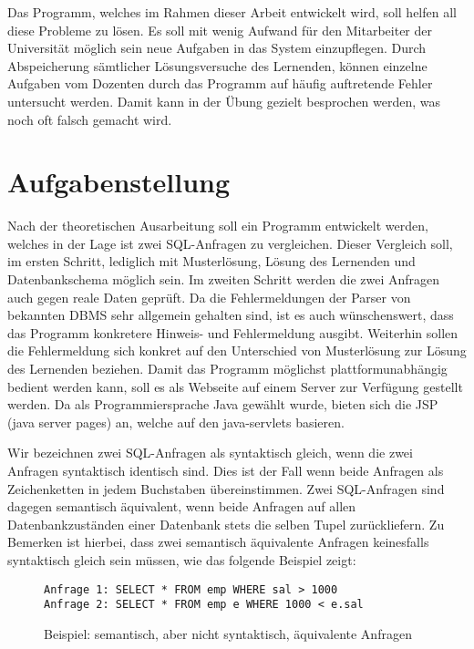 Das Programm, welches im Rahmen dieser Arbeit entwickelt wird, soll helfen all diese Probleme zu lösen. Es soll mit wenig Aufwand für den Mitarbeiter der Universität möglich sein neue Aufgaben in das System einzupflegen. Durch Abspeicherung sämtlicher Lösungsversuche des Lernenden, können einzelne Aufgaben vom Dozenten durch das Programm auf häufig auftretende Fehler untersucht werden. Damit kann in der Übung gezielt besprochen werden, was noch oft falsch gemacht wird.

\section{Aufgabenstellung}

Nach der theoretischen Ausarbeitung soll ein Programm entwickelt werden, welches in der Lage ist zwei SQL-Anfragen zu vergleichen. Dieser Vergleich soll, im ersten Schritt, lediglich mit Musterlösung, Lösung des Lernenden und Datenbankschema möglich sein. Im zweiten Schritt werden die zwei Anfragen auch gegen reale Daten geprüft. Da die Fehlermeldungen der Parser von bekannten DBMS sehr allgemein gehalten sind, ist es auch wünschenswert, dass das Programm konkretere Hinweis- und Fehlermeldung ausgibt. Weiterhin sollen die Fehlermeldung sich konkret auf den Unterschied von Musterlösung zur Lösung des Lernenden beziehen. Damit das Programm möglichst plattformunabhängig bedient werden kann, soll es als Webseite auf einem Server zur Verfügung gestellt werden. Da als Programmiersprache Java gewählt wurde, bieten sich die JSP (java server pages) an, welche auf den java-servlets basieren.

Wir bezeichnen zwei SQL-Anfragen als syntaktisch gleich, wenn die zwei Anfragen syntaktisch identisch sind. Dies ist der Fall wenn beide Anfragen als Zeichenketten in jedem Buchstaben übereinstimmen. Zwei SQL-Anfragen sind dagegen semantisch äquivalent, wenn beide Anfragen auf allen Datenbankzuständen einer Datenbank stets die selben Tupel zurückliefern. Zu Bemerken ist hierbei, dass zwei semantisch äquivalente Anfragen keinesfalls syntaktisch gleich sein müssen, wie das folgende Beispiel zeigt:

\begin{figure}[h]
\begin{verbatim}
Anfrage 1: SELECT * FROM emp WHERE sal > 1000
Anfrage 2: SELECT * FROM emp e WHERE 1000 < e.sal
\end{verbatim}
\caption{Beispiel: semantisch, aber nicht syntaktisch, äquivalente Anfragen}
\end{figure}

